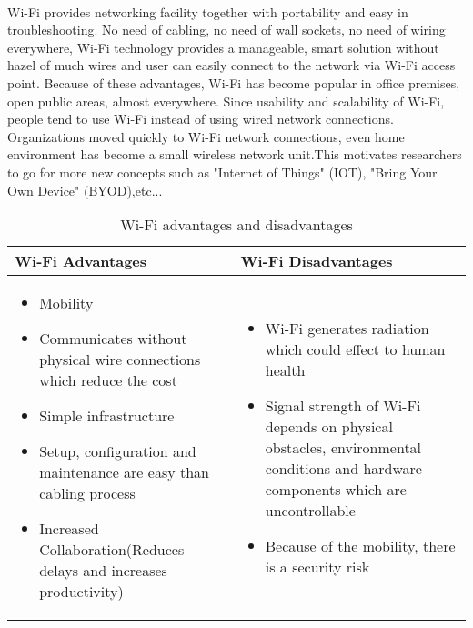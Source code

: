 \paragraph{}
Wi-Fi provides networking facility together with portability and easy in troubleshooting. No need of cabling, no need of wall sockets, no need of wiring everywhere, Wi-Fi technology provides a manageable, smart solution without hazel of much wires and user can easily connect to the network via Wi-Fi access point. Because of these advantages, Wi-Fi has become popular in office premises, open public areas, almost everywhere. Since usability and scalability of Wi-Fi, people tend to use Wi-Fi instead of using wired network connections. Organizations moved quickly to Wi-Fi network connections, even home environment has become a small wireless network unit.This motivates researchers to go for more new concepts such as "Internet of Things" (IOT), "Bring Your Own Device" (BYOD),etc... 

\begin{center}
	\begin{table}[H]			
		\begin{tabu}  { | X[c] | X[c] | }	
			\hline
			Wi-Fi Advantages& Wi-Fi Disadvantages \\
			\hline
			\begin{itemize}
				\item Mobility
				\item Communicates without physical wire connections which reduce the cost
				\item Simple infrastructure
				\item Setup, configuration and maintenance are easy than cabling process
				\item Increased Collaboration(Reduces delays and increases productivity)
			\end{itemize} & 
			\begin{itemize}
				\item Wi-Fi generates radiation which could effect to human health
				\item Signal strength of Wi-Fi depends on physical obstacles, environmental conditions and hardware components which are uncontrollable
				\item Because of the mobility, there is a security risk
			\end{itemize}\\
			\hline
		\end{tabu}
		\caption[Wi-Fi advantages and disadvantages]{Wi-Fi advantages and disadvantages}
		\label{table:aimPt_isol}
	\end{table}
\end{center}


